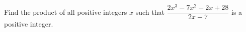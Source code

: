Find the product of all positive integers $x$ such that $\dfrac{2x^3-7x^2-2x+28}{2x-7}$ is a positive integer.
